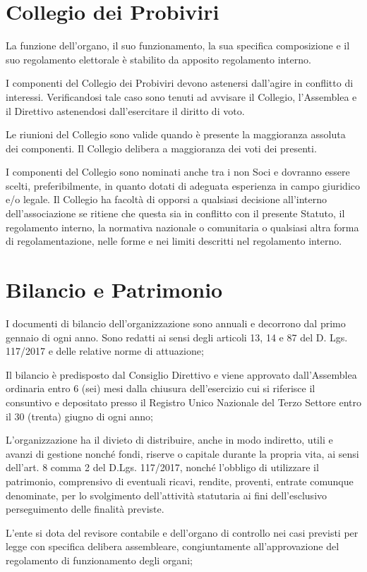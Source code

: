 \documentclass[legalpaper, 11pt]{exam}
\let\tempone\enumerate
\let\temptwo\endenumerate
\renewenvironment{enumerate}{\tempone\addtolength{\itemsep}{-0.45\baselineskip}}{\temptwo}
\begin{document}
{\section{Collegio dei Probiviri}
\begin{enumerate}
 \item La funzione dell’organo, il suo funzionamento, la sua specifica composizione e il suo regolamento elettorale è stabilito da apposito regolamento interno.
 \item I componenti del Collegio dei Probiviri devono astenersi dall’agire in conflitto di interessi. Verificandosi tale caso sono tenuti ad avvisare il Collegio, l’Assemblea e il Direttivo astenendosi dall’esercitare il diritto di voto.
 \item Le riunioni del Collegio sono valide quando è presente la maggioranza assoluta dei componenti. Il Collegio delibera a maggioranza dei voti dei presenti.
 \item I componenti del Collegio sono nominati anche tra i non Soci e dovranno essere scelti,
 preferibilmente, in quanto dotati di adeguata esperienza in campo giuridico e/o legale.
 Il Collegio ha facoltà di opporsi a qualsiasi decisione all’interno dell’associazione se ritiene che questa sia in conflitto con il presente Statuto, il regolamento interno, la normativa nazionale o comunitaria o qualsiasi altra forma di regolamentazione, nelle forme e nei limiti descritti nel regolamento interno.
\end{enumerate}

\section{Bilancio e Patrimonio}
\begin{enumerate}
 \item I documenti di bilancio dell’organizzazione sono annuali e decorrono dal primo gennaio di ogni anno. Sono redatti ai sensi degli articoli 13, 14 e 87 del D. Lgs. 117/2017 e delle relative norme di attuazione;
 \item Il bilancio è predisposto dal Consiglio Direttivo e viene approvato dall’Assemblea ordinaria entro 6 (sei) mesi dalla chiusura dell’esercizio cui si riferisce il consuntivo e depositato presso il Registro Unico Nazionale del Terzo Settore entro il 30 (trenta) giugno di ogni anno;
 \item L’organizzazione ha il divieto di distribuire, anche in modo indiretto, utili e avanzi di gestione nonché fondi, riserve o capitale durante la propria vita, ai sensi dell’art. 8 comma 2 del D.Lgs. 117/2017, nonché l’obbligo di utilizzare il patrimonio, comprensivo di eventuali ricavi, rendite, proventi, entrate comunque denominate, per lo svolgimento dell’attività statutaria ai fini dell’esclusivo perseguimento delle finalità previste.
 \item L’ente si dota del revisore contabile e dell’organo di controllo nei casi previsti per legge con specifica delibera assembleare, congiuntamente all’approvazione del regolamento di funzionamento degli organi;
\end{enumerate}

}
\end{document}
